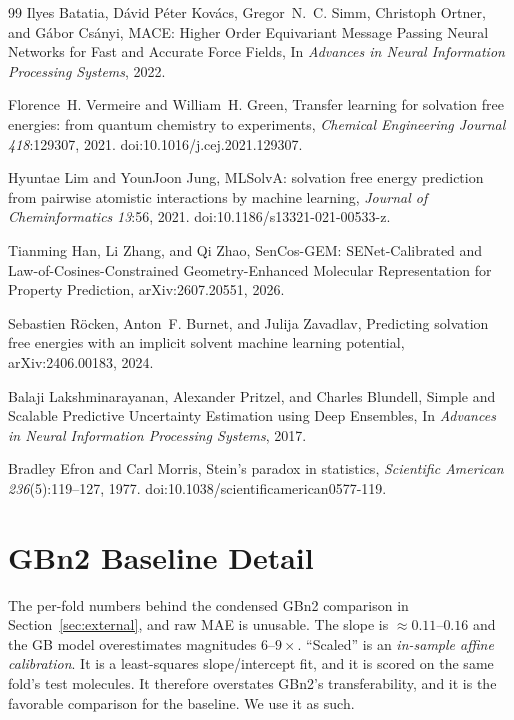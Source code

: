 \documentclass{article}
\begin{document}
\begin{thebibliography}{99}
Ilyes Batatia, D\'avid P\'eter Kov\'acs, Gregor~N.~C. Simm, Christoph Ortner, and G\'abor Cs\'anyi,
MACE: Higher Order Equivariant Message Passing Neural Networks for Fast and Accurate Force Fields,
In {\it Advances in Neural Information Processing Systems}, 2022.

Florence~H. Vermeire and William~H. Green,
Transfer learning for solvation free energies: from quantum chemistry to experiments,
{\it Chemical Engineering Journal} {\it 418}:129307, 2021.
doi:10.1016/j.cej.2021.129307.

Hyuntae Lim and YounJoon Jung,
MLSolvA: solvation free energy prediction from pairwise atomistic interactions by machine learning,
{\it Journal of Cheminformatics} {\it 13}:56, 2021.
doi:10.1186/s13321-021-00533-z.

Tianming Han, Li Zhang, and Qi Zhao,
SenCos-GEM: SENet-Calibrated and Law-of-Cosines-Constrained Geometry-Enhanced Molecular Representation for Property Prediction,
arXiv:2607.20551, 2026.

Sebastien R\"ocken, Anton~F. Burnet, and Julija Zavadlav,
Predicting solvation free energies with an implicit solvent machine learning potential,
arXiv:2406.00183, 2024.

Balaji Lakshminarayanan, Alexander Pritzel, and Charles Blundell,
Simple and Scalable Predictive Uncertainty Estimation using Deep Ensembles,
In {\it Advances in Neural Information Processing Systems}, 2017.

Bradley Efron and Carl Morris,
Stein's paradox in statistics,
{\it Scientific American} {\it 236}(5):119--127, 1977.
doi:10.1038/scientificamerican0577-119.

\end{thebibliography}


\appendix

\section{GBn2 Baseline Detail}
\label{app:gbn2}

The per-fold numbers behind the condensed GBn2 comparison in
Section~\ref{sec:external}, and raw MAE is unusable. The slope is
$\approx 0.11$--$0.16$ and the GB model overestimates magnitudes $6$--$9\times$.
``Scaled'' is an \emph{in-sample affine calibration}. It is a least-squares
slope/intercept fit, and it is scored on the same fold's test molecules. It
therefore overstates GBn2's transferability, and it is the favorable comparison
for the baseline. We use it as such.
\end{document}
